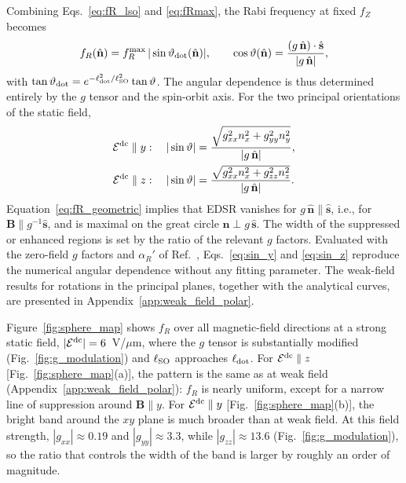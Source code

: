 \documentclass[
  aps,
  reprint,
  amsmath,
  amssymb,
  groupedaddress,
  floatfix,
  longbibliography,
]{revtex4-2}
\newcommand{\Edc}{\mathcal{E}^{\rm dc}}
\newcommand{\ldot}{\ell_{\rm dot}}
\newcommand{\lso}{\ell_{\rm SO}}
\newcommand{\nhat}{\hat{\mathbf n}}
\newcommand{\shat}{\hat{\mathbf s}}
\begin{document}
Combining Eqs.~\eqref{eq:fR_lso} and \eqref{eq:fRmax}, the Rabi frequency at fixed $f_Z$ becomes
\begin{align}
f_R(\nhat)=f_R^{\max}\,|\sin\vartheta_{\rm dot}(\nhat)|,
\qquad
\cos\vartheta(\nhat)=\frac{(g\,\nhat)\cdot\shat}{|g\,\nhat|},
\label{eq:fR_geometric}
\end{align}
with $\tan\vartheta_{\rm dot}=e^{-\ldot^2/\lso^2}\tan\vartheta$. The angular dependence is thus determined entirely by the $g$ tensor and the spin-orbit axis. For the two principal orientations of the static field,
\begin{align}
\Edc\parallel y:\quad |\sin\vartheta| &= \frac{\sqrt{g_{xx}^2n_x^2+g_{yy}^2n_y^2}}{|g\,\nhat|},
\label{eq:sin_y}\\
\Edc\parallel z:\quad |\sin\vartheta| &= \frac{\sqrt{g_{xx}^2n_x^2+g_{zz}^2n_z^2}}{|g\,\nhat|}.
\label{eq:sin_z}
\end{align}
Equation~\eqref{eq:fR_geometric} implies that EDSR vanishes for $g\,\nhat\parallel\shat$, i.e., for $\mathbf{B}\parallel g^{-1}\shat$, and is maximal on the great circle $\nhat\perp g\,\shat$. The width of the suppressed or enhanced regions is set by the ratio of the relevant $g$ factors. Evaluated with the zero-field $g$ factors and $\alpha_R'$ of Ref.~\cite{das2026anisotropic}, Eqs.~\eqref{eq:sin_y} and \eqref{eq:sin_z} reproduce the numerical angular dependence without any fitting parameter. The weak-field results for rotations in the principal planes, together with the analytical curves, are presented in Appendix~\ref{app:weak_field_polar}.

Figure~\ref{fig:sphere_map} shows $f_R$ over all magnetic-field directions at a strong static field, $|\Edc|=6$~V/$\mu$m, where the $g$ tensor is substantially modified (Fig.~\ref{fig:g_modulation}) and $\lso$ approaches $\ldot$. For $\Edc\parallel z$ [Fig.~\ref{fig:sphere_map}(a)], the pattern is the same as at weak field (Appendix~\ref{app:weak_field_polar}): $f_R$ is nearly uniform, except for a narrow line of suppression around $\mathbf{B}\parallel y$. For $\Edc\parallel y$ [Fig.~\ref{fig:sphere_map}(b)], the bright band around the $xy$ plane is much broader than at weak field. At this field strength, $|g_{xx}|\approx0.19$ and $|g_{yy}|\approx3.3$, while $|g_{zz}|\approx13.6$ (Fig.~\ref{fig:g_modulation}), so the ratio that controls the width of the band is larger by roughly an order of magnitude.
\end{document}

